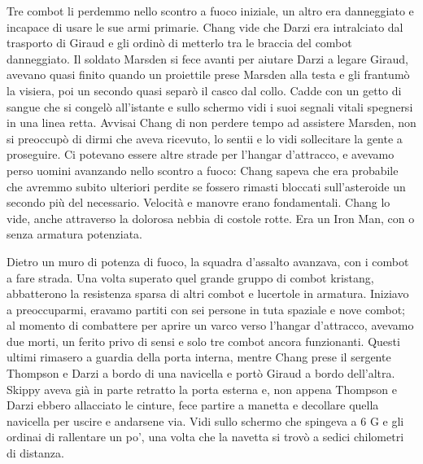 Tre combot li perdemmo nello scontro a fuoco iniziale, un altro era
danneggiato e incapace di usare le sue armi primarie. Chang vide che
Darzi era intralciato dal trasporto di Giraud e gli ordinò di metterlo
tra le braccia del combot danneggiato. Il soldato Marsden si fece avanti
per aiutare Darzi a legare Giraud, avevano quasi finito quando un
proiettile prese Marsden alla testa e gli frantumò la visiera, poi un
secondo quasi separò il casco dal collo. Cadde con un getto di sangue
che si congelò all'istante e sullo schermo vidi i suoi segnali vitali
spegnersi in una linea retta. Avvisai Chang di non perdere tempo ad
assistere Marsden, non si preoccupò di dirmi che aveva ricevuto, lo
sentii e lo vidi sollecitare la gente a proseguire. Ci potevano essere
altre strade per l'hangar d'attracco, e avevamo perso uomini avanzando
nello scontro a fuoco: Chang sapeva che era probabile che avremmo subito
ulteriori perdite se fossero rimasti bloccati sull'asteroide un secondo
più del necessario. Velocità e manovre erano fondamentali. Chang lo
vide, anche attraverso la dolorosa nebbia di costole rotte. Era un Iron
Man, con o senza armatura potenziata.

Dietro un muro di potenza di fuoco, la squadra d'assalto avanzava, con i
combot a fare strada. Una volta superato quel grande gruppo di combot
kristang, abbatterono la resistenza sparsa di altri combot e lucertole
in armatura. Iniziavo a preoccuparmi, eravamo partiti con sei persone in
tuta spaziale e nove combot; al momento di combattere per aprire un
varco verso l'hangar d'attracco, avevamo due morti, un ferito privo di
sensi e solo tre combot ancora funzionanti. Questi ultimi rimasero a
guardia della porta interna, mentre Chang prese il sergente Thompson e
Darzi a bordo di una navicella e portò Giraud a bordo dell'altra. Skippy
aveva già in parte retratto la porta esterna e, non appena Thompson e
Darzi ebbero allacciato le cinture, fece partire a manetta e decollare
quella navicella per uscire e andarsene via. Vidi sullo schermo che
spingeva a 6 G e gli ordinai di rallentare un po', una volta che la
navetta si trovò a sedici chilometri di distanza.


